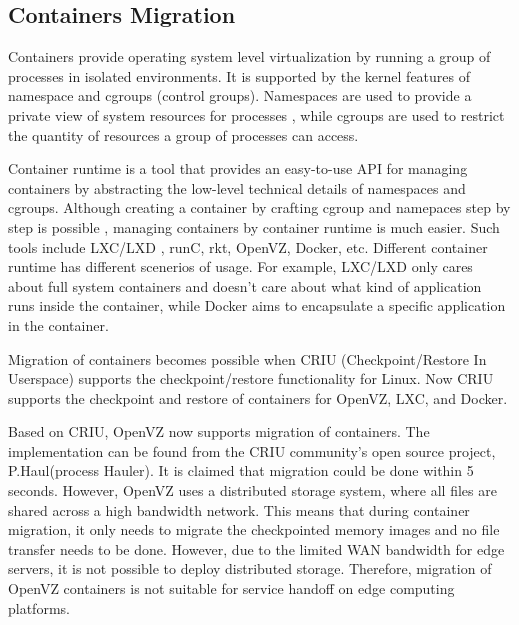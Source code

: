 \subsection{Containers Migration}

Containers provide operating system level virtualization by running a group of processes in isolated environments. It is supported by the kernel features of namespace 
 and cgroups (control groups)\cite{rosen2014container}.
Namespaces are used to provide a private view of system resources for processes \cite{pike1992plan9}, while cgroups are used to restrict the quantity of resources a group of processes can access\cite{rosen2013namespaceIntro}.  


Container runtime is a tool that provides an easy-to-use API for managing containers by abstracting the low-level technical details of namespaces and cgroups. 
Although creating a container by crafting cgroup and namepaces step by step is possible \cite{conScratch}, managing containers by container runtime is much easier.  Such tools include LXC/LXD\cite{LXC} ,
runC\cite{runc},
rkt\cite{rkt}, 
OpenVZ\cite{openvz}, 
Docker\cite{docker}, etc. Different container runtime has different scenerios of usage. For example, LXC/LXD only cares about full system containers and doesn't care about what kind of application runs inside the container, while Docker aims to encapsulate a specific application in the container.  

Migration of containers becomes possible when CRIU (Checkpoint/Restore In Userspace)\cite{criu} supports the checkpoint/restore functionality for Linux. 
Now CRIU supports the checkpoint and restore of containers for OpenVZ, LXC, and Docker. 


Based on CRIU, OpenVZ now supports migration of containers. The implementation can be found from the CRIU community's open source project, P.Haul(process Hauler)\cite{phaul}.  It is claimed that migration could be done within 5 seconds\cite{livmigcon}.
However, OpenVZ uses a distributed storage system\cite{openvzfs}, where all files are shared across a high bandwidth network. 
This means that during container migration, it only needs to migrate the checkpointed memory images and no file transfer needs to be done. 
However, due to the limited WAN bandwidth for edge servers, it is not possible to deploy distributed storage. Therefore, migration of OpenVZ containers is not suitable for service handoff on edge computing platforms.

